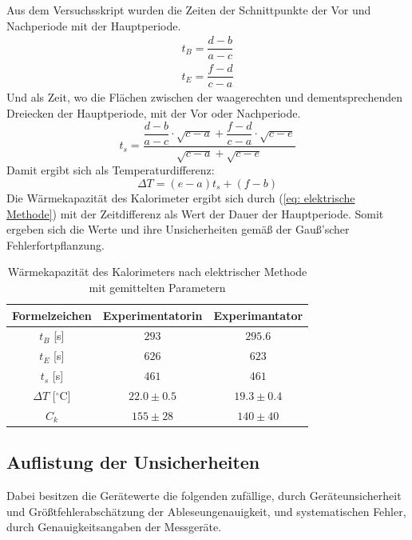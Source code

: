\documentclass[bibliography=totocnumbered]{scrartcl}
\begin{document}
	Aus dem Versuchsskript\smartcite{Muller.c} wurden die Zeiten der Schnittpunkte der Vor und Nachperiode mit der Hauptperiode. 
	\begin{align}
		t_{B}=\dfrac{d-b}{a-c}\\
		t_{E}=\dfrac{f-d}{c-a}
	\end{align}
	Und als Zeit\smartcite{Muller.c}, wo die Flächen zwischen der waagerechten und dementsprechenden Dreiecken der
	Hauptperiode, mit der Vor oder Nachperiode.
	\begin{equation}\label{eq: ts}
		t_{s}=\dfrac{\dfrac{d-b}{a-c}\cdot \sqrt{c-a}+\dfrac{f-d}{c-a} \cdot \sqrt{c-e}}{\sqrt{c-a}+\sqrt{c-e}}
	\end{equation}
	Damit ergibt sich als Temperaturdifferenz:
	\begin{equation}\label{eq: Temperaturdifferenz}
		\Delta T= (e-a)t_{s}+(f-b)
	\end{equation}
	\newpage
	Die Wärmekapazität des Kalorimeter ergibt sich durch (\ref{eq: elektrische Methode}) mit der Zeitdifferenz als Wert der Dauer
	der Hauptperiode.
	Somit ergeben sich die Werte und ihre Unsicherheiten gemäß der Gauß'scher Fehlerfortpflanzung.
	\begin{table}[ht!]
		\centering
		\caption[Wärmekapazität]{Wärmekapazität des Kalorimeters nach elektrischer Methode mit gemittelten Parametern}
		\begin{tabular}{|c||c|c|}
			\hline
			\textbf{Formelzeichen} & \textbf{Experimentatorin} & \textbf{Experimantator} \\
			\hline\hline
			$ t_{B} $ [s]& $  293 $ & $  295.6 $ \\
			\hline
			$ t_{E} $ [s]& $  626 $ & $ 623  $ \\
			\hline
			$ t_{s} $ [s]& $  461 $ & $  461 $ \\
			\hline
			$ \Delta T $ [$ ^{\circ} $C]& $ 22.0\pm 0.5$ &$ 19.3\pm 0.4$  \\
			\hline
			$ C_{k} $&$ 155\pm28 $  & $ 140\pm 40 $ \\
			\hline
		\end{tabular}
		\label{tab: Ck nach el. Meth.}
	\end{table}
	
	\subsection{Auflistung der Unsicherheiten}
	Dabei besitzen die Gerätewerte die folgenden zufällige, durch Geräteunsicherheit und
	Größtfehlerabschätzung der Ableseungenauigkeit, und systematischen Fehler, durch
	Genauigkeitsangaben der Messgeräte.
	
\end{document}

